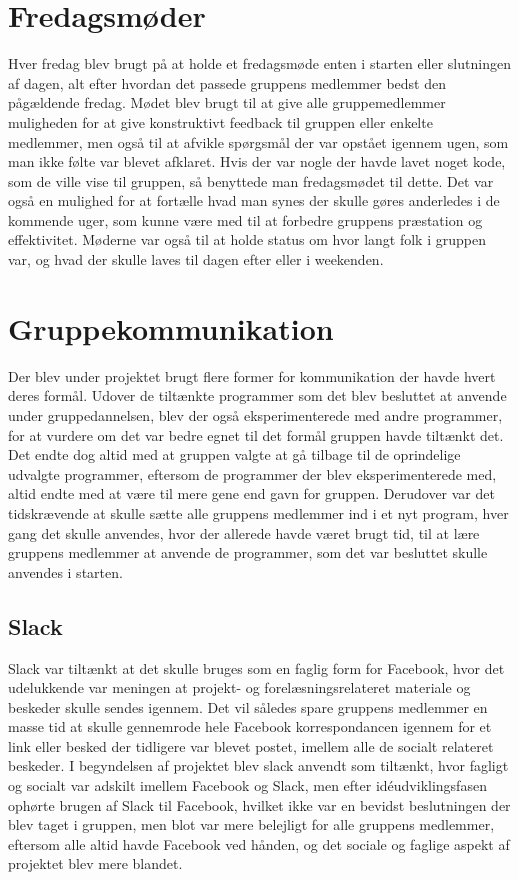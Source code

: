 \section{Fredagsmøder}\label{Fredagsmoeder}
Hver fredag blev brugt på at holde et fredagsmøde enten i starten eller slutningen af dagen, alt efter hvordan det passede gruppens medlemmer bedst den pågældende fredag. Mødet blev brugt til at give alle gruppemedlemmer muligheden for at give konstruktivt feedback til gruppen eller enkelte medlemmer, men også til at afvikle spørgsmål der var opstået igennem ugen, som man ikke følte var blevet afklaret. Hvis der var nogle der havde lavet noget kode, som de ville vise til gruppen, så benyttede man fredagsmødet til dette. Det var også en mulighed for at fortælle hvad man synes der skulle gøres anderledes i de kommende uger, som kunne være med til at forbedre gruppens præstation og effektivitet. Møderne var også til at holde status om hvor langt folk i gruppen var, og hvad der skulle laves til dagen efter eller i weekenden.

\section{Gruppekommunikation}\label{Gruppekommunikation}
Der blev under projektet brugt flere former for kommunikation der havde hvert deres formål. Udover de tiltænkte programmer som det blev besluttet at anvende under gruppedannelsen, blev der også eksperimenterede med andre programmer, for at vurdere om det var bedre egnet til det formål gruppen havde tiltænkt det. Det endte dog altid med at gruppen valgte at gå tilbage til de oprindelige udvalgte programmer, eftersom de programmer der blev eksperimenterede med, altid endte med at være til mere gene end gavn for gruppen. Derudover var det tidskrævende at skulle sætte alle gruppens medlemmer ind i et nyt program, hver gang det skulle anvendes, hvor der allerede havde været brugt tid, til at lære gruppens medlemmer at anvende de programmer, som det var besluttet skulle anvendes i starten.

\subsection*{Slack}\label{Slack}
Slack var tiltænkt at det skulle bruges som en faglig form for Facebook, hvor det udelukkende var meningen at projekt- og forelæsningsrelateret materiale og beskeder skulle sendes igennem. Det vil således spare gruppens medlemmer en masse tid at skulle gennemrode hele Facebook korrespondancen igennem for et link eller besked der tidligere var blevet postet, imellem alle de socialt relateret beskeder. I begyndelsen af projektet blev slack anvendt som tiltænkt, hvor fagligt og socialt var adskilt imellem Facebook og Slack, men efter idéudviklingsfasen ophørte brugen af Slack til Facebook, hvilket ikke var en bevidst beslutningen der blev taget i gruppen, men blot var mere belejligt for alle gruppens medlemmer, eftersom alle altid havde Facebook ved hånden, og det sociale og faglige aspekt af projektet blev mere blandet. 

